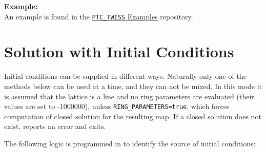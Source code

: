 

\textbf{Example:} \\
An example is found in the
\href{http://madx.web.cern.ch/madx/madX/examples/ptc_twiss/SliceMagnets/}
{\texttt{PTC\_TWISS} Examples} repository. 



\section{Solution with Initial Conditions}
\label{sec:ptc-twiss-sol-initial-cond}


Initial conditions can be supplied in different ways.  Naturally only
one of the methods below can be used at a time, and they can not be
mixed.  In this mode it is assumed that the lattice is a line and no
ring parameters are evaluated (their values are set to -1000000), unless
\texttt{RING\_PARAMETERS=true}, which forces computation of closed solution
for the resulting map. If a closed solution does not exist, \ptc
reports an error and exits.

The following logic is programmed in \ptc to identify the source of
initial conditions: 



